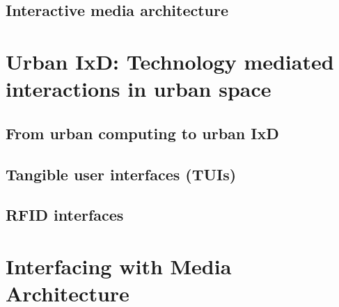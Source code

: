 \subsection{Interactive media architecture}

\blindtext

\section{Urban IxD: Technology mediated interactions in urban space}

\blindtext

\subsection{From urban computing to urban IxD}

\blindtext

\subsection{Tangible user interfaces (TUIs)}

\blindtext

\subsection{RFID interfaces}

\blindtext

\section {Interfacing with Media Architecture}

